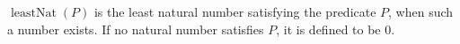 \(\operatorname{leastNat}(P)\) is the least natural number satisfying the
predicate \(P\), when such a number exists.  If no natural number satisfies
\(P\), it is defined to be \(0\).
